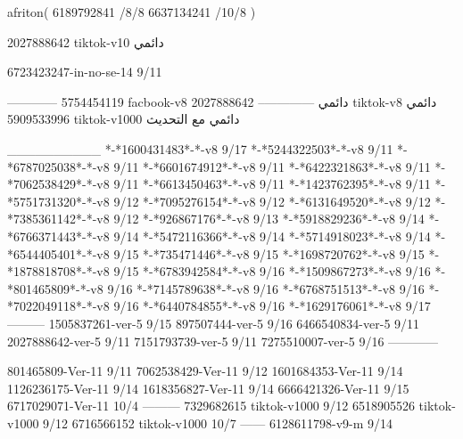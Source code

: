 afriton(
6189792841 /8/8
6637134241 /10/8
)

2027888642 tiktok-v10
دائمي



6723423247-in-no-se-14 9/11

------------
5754454119 facbook-v8
دائمي
--------------
2027888642 tiktok-v8
دائمي
5909533996 tiktok-v1000
دائمي مع التحديث

__________
*-*1600431483*-*-v8 9/17
*-*5244322503*-*-v8 9/11
*-*6787025038*-*-v8 9/11
*-*6601674912*-*-v8 9/11
*-*6422321863*-*-v8 9/11
*-*7062538429*-*-v8 9/11
*-*6613450463*-*-v8 9/11
*-*1423762395*-*-v8 9/11
*-*5751731320*-*-v8 9/12
*-*7095276154*-*-v8 9/12
*-*6131649520*-*-v8 9/12
*-*7385361142*-*-v8 9/12
*-*926867176*-*-v8 9/13
*-*5918829236*-*-v8 9/14
*-*6766371443*-*-v8 9/14
*-*5472116366*-*-v8 9/14
*-*5714918023*-*-v8 9/14
*-*6544405401*-*-v8 9/15
*-*735471446*-*-v8 9/15
*-*1698720762*-*-v8 9/15
*-*1878818708*-*-v8 9/15
*-*6783942584*-*-v8 9/16
*-*1509867273*-*-v8 9/16
*-*801465809*-*-v8 9/16
*-*7145789638*-*-v8 9/16
*-*6768751513*-*-v8 9/16
*-*7022049118*-*-v8 9/16
*-*6440784855*-*-v8 9/16
*-*1629176061*-*-v8 9/17
---------
1505837261-ver-5 9/15
897507444-ver-5 9/16
6466540834-ver-5 9/11
2027888642-ver-5 9/11
7151793739-ver-5 9/11
7275510007-ver-5 9/16
------------



801465809-Ver-11
9/11
7062538429-Ver-11
9/12
1601684353-Ver-11
9/14
1126236175-Ver-11
9/14
1618356827-Ver-11
9/14
6666421326-Ver-11
9/15
6717029071-Ver-11
10/4
---------
7329682615 tiktok-v1000
9/12
6518905526 tiktok-v1000
9/12
6716566152 tiktok-v1000
10/7
------
6128611798-v9-m
9/14
